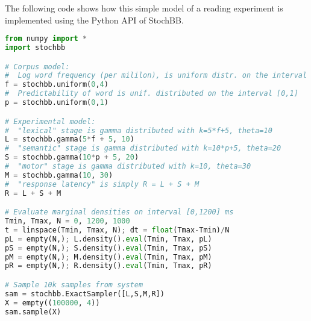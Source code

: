 The following code shows how this simple model of a reading experiment is implemented using the
Python API of StochBB.

\begin{lstlisting}[language=Python]
from numpy import *
import stochbb

# Corpus model:
#  Log word frequency (per mililon), is uniform distr. on the interval [0,4]
f = stochbb.uniform(0,4)
#  Predictability of word is unif. distributed on the interval [0,1]
p = stochbb.uniform(0,1)

# Experimental model:
#  "lexical" stage is gamma distributed with k=5*f+5, theta=10
L = stochbb.gamma(5*f + 5, 10)
#  "semantic" stage is gamma distributed with k=10*p+5, theta=20
S = stochbb.gamma(10*p + 5, 20)
#  "motor" stage is gamma distributed with k=10, theta=30
M = stochbb.gamma(10, 30)
#  "response latency" is simply R = L + S + M
R = L + S + M

# Evaluate marginal densities on interval [0,1200] ms
Tmin, Tmax, N = 0, 1200, 1000
t = linspace(Tmin, Tmax, N); dt = float(Tmax-Tmin)/N
pL = empty(N,); L.density().eval(Tmin, Tmax, pL)
pS = empty(N,); S.density().eval(Tmin, Tmax, pS)
pM = empty(N,); M.density().eval(Tmin, Tmax, pM)
pR = empty(N,); R.density().eval(Tmin, Tmax, pR)

# Sample 10k samples from system
sam = stochbb.ExactSampler([L,S,M,R])
X = empty((100000, 4))
sam.sample(X)
\end{lstlisting}

